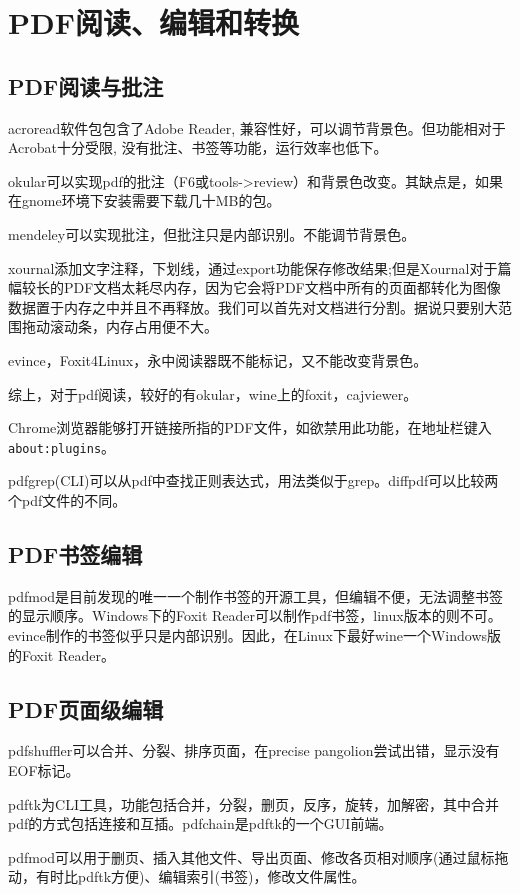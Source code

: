 \section{PDF阅读、编辑和转换}

\subsection{PDF阅读与批注}
acroread软件包包含了Adobe Reader, 兼容性好，可以调节背景色。但功能相对于Acrobat十分受限, 没有批注、书签等功能，运行效率也低下。

okular可以实现pdf的批注（F6或tools->review）和背景色改变。其缺点是，如果在gnome环境下安装需要下载几十MB的包。

mendeley可以实现批注，但批注只是内部识别。不能调节背景色。

xournal添加文字注释，下划线，通过export功能保存修改结果;但是Xournal对于篇幅较长的PDF文档太耗尽内存，因为它会将PDF文档中所有的页面都转化为图像数据置于内存之中并且不再释放。我们可以首先对文档进行分割。据说只要别大范围拖动滚动条，内存占用便不大。

evince，Foxit4Linux，永中阅读器既不能标记，又不能改变背景色。

综上，对于pdf阅读，较好的有okular，wine上的foxit，cajviewer。

Chrome浏览器能够打开链接所指的PDF文件，如欲禁用此功能，在地址栏键入\verb|about:plugins|。

pdfgrep(CLI)可以从pdf中查找正则表达式，用法类似于grep。diffpdf可以比较两个pdf文件的不同。

\subsection{PDF书签编辑}
pdfmod是目前发现的唯一一个制作书签的开源工具，但编辑不便，无法调整书签的显示顺序。Windows下的Foxit Reader可以制作pdf书签，linux版本的则不可。evince制作的书签似乎只是内部识别。因此，在Linux下最好wine一个Windows版的Foxit Reader。

\subsection{PDF页面级编辑}

pdfshuffler可以合并、分裂、排序页面，在precise pangolion尝试出错，显示没有EOF标记。

pdftk为CLI工具，功能包括合并，分裂，删页，反序，旋转，加解密，其中合并pdf的方式包括连接和互插。pdfchain是pdftk的一个GUI前端。

pdfmod可以用于删页、插入其他文件、导出页面、修改各页相对顺序(通过鼠标拖动，有时比pdftk方便)、编辑索引(书签)，修改文件属性。

